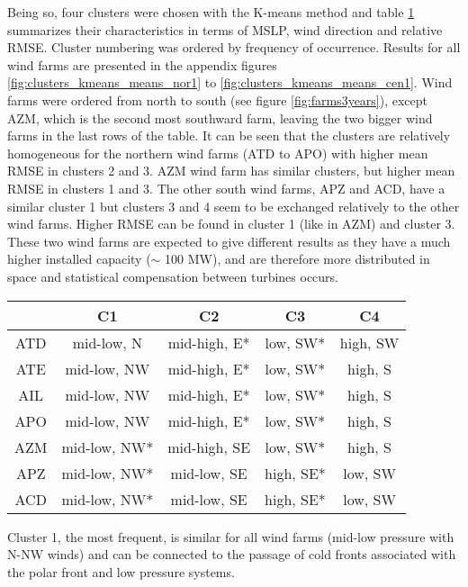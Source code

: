 Being so, four clusters were chosen with the K-means method and table \ref{tb:clusters} summarizes their characteristics in terms of MSLP, wind direction and relative RMSE. Cluster numbering was ordered by frequency of occurrence. Results for all wind farms are presented in the appendix figures \ref{fig:clusters_kmeans_means_nor1} to \ref{fig:clusters_kmeans_means_cen1}. Wind farms were ordered from north to south (see figure \ref{fig:farms3years}), except AZM, which is the second most southward farm, leaving the two bigger wind farms in the last rows of the table. It can be seen that the clusters are relatively homogeneous for the northern wind farms (ATD to APO) with higher mean RMSE in clusters 2 and 3. AZM wind farm has similar clusters, but higher mean RMSE in clusters 1 and 3. The other south wind farms, APZ and ACD, have a similar cluster 1 but clusters 3 and 4 seem to be exchanged relatively to the other wind farms. Higher RMSE can be found in cluster 1 (like in AZM) and cluster 3. These two wind farms are expected to give different results as they have a much higher installed capacity ($\sim$ 100 MW), and are therefore more distributed in space and statistical compensation between turbines occurs.

\begin{table}[!htp]
\small
\centering
{}
\label{tb:clusters}
\begin{tabular}{ccccc}
\toprule
     & C1 & C2 & C3 & C4 \\
\midrule
ATD  & mid-low, N   & mid-high, E* & low, SW*  & high, SW \\
ATE  & mid-low, NW  & mid-high, E* & low, SW*  & high, S \\
AIL  & mid-low, NW  & mid-high, E* & low, SW*  & high, S \\
APO  & mid-low, NW  & mid-high, E* & low, SW*  & high, S \\ \midrule
AZM  & mid-low, NW* & mid-high, SE & low, SW*  & high, S \\ 
APZ  & mid-low, NW* & mid-low, SE  & high, SE* & low, SW \\ 
ACD  & mid-low, NW* & mid-low, SE  & high, SE* & low, SW \\ 
\bottomrule
\end{tabular}
\end{table}
\FloatBarrier

Cluster 1, the most frequent, is similar for all wind farms (mid-low pressure with N-NW winds) and can be connected to the passage of cold fronts associated with the polar front and low pressure systems.

